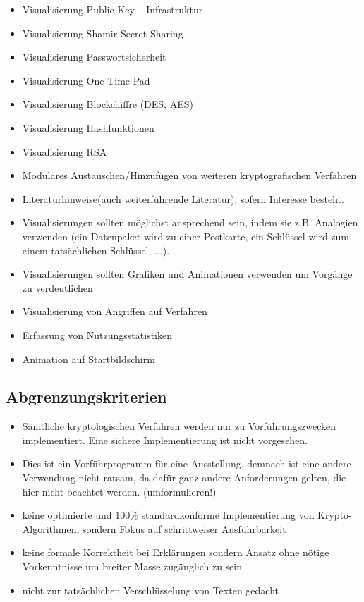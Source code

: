 \documentclass{article}
\begin{document}
\begin{itemize}
    \item Visualisierung Public Key – Infrastruktur
    \item Visualisierung Shamir Secret Sharing
    \item Visualisierung Passwortsicherheit
    \item Visualisierung One-Time-Pad
    \item Visualisierung Blockchiffre (DES, AES)
    \item Visualisierung Hashfunktionen
    \item Visualisierung RSA
    \item Modulares Austauschen/Hinzufügen von weiteren kryptografischen Verfahren
    \item Literaturhinweise(auch weiterführende Literatur), sofern Interesse besteht.
    \item Visualisierungen sollten möglichst ansprechend sein, indem sie z.B. Analogien 
        verwenden (ein Datenpaket wird zu einer Postkarte, ein Schlüssel wird zum einem tatsächlichen Schlüssel, ...).
    \item Visualisierungen sollten Grafiken und Animationen verwenden um Vorgänge zu verdeutlichen
    \item Visualisierung von Angriffen auf Verfahren
    \item Erfassung von Nutzungsstatistiken
    \item Animation auf Startbildschirm
\end{itemize}

\subsection{Abgrenzungskriterien}
\begin{itemize}
    \item Sämtliche kryptologischen Verfahren werden nur zu Vorführungszwecken implementiert. Eine sichere Implementierung ist nicht vorgesehen.
    \item Dies ist ein Vorführprogramm für eine Ausstellung, demnach ist eine andere  Verwendung nicht ratsam, 
        da dafür ganz andere Anforderungen gelten, die hier nicht beachtet werden. (umformulieren!)
    \item keine optimierte und 100\% standardkonforme Implementierung von Krypto-Algorithmen, 
        sondern Fokus auf schrittweiser Ausführbarkeit
    \item keine formale Korrektheit bei Erklärungen sondern Ansatz ohne nötige Vorkenntnisse 
        um breiter Masse zugänglich zu sein
    \item nicht zur tatsächlichen Verschlüsselung von Texten gedacht 
\end{itemize}
\end{document}
